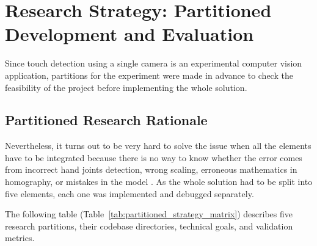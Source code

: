 \section{Research Strategy: Partitioned Development and Evaluation}
\label{sec:meth_strategy}
Since touch detection using a single camera is an experimental computer vision application, partitions for the experiment were made in advance to check the feasibility of the project before implementing the whole solution.

\subsection{Partitioned Research Rationale}
Nevertheless, it turns out to be very hard to solve the issue when all the elements have to be integrated because there is no way to know whether the error comes from incorrect hand joints detection, wrong scaling, erroneous mathematics in homography, or mistakes in the model \cite{Cui2020Deep, Doan2022Efficient}. As the whole solution had to be split into five elements, each one was implemented and debugged separately.

The following table (Table~\ref{tab:partitioned_strategy_matrix}) describes five research partitions, their codebase directories, technical goals, and validation metrics.

